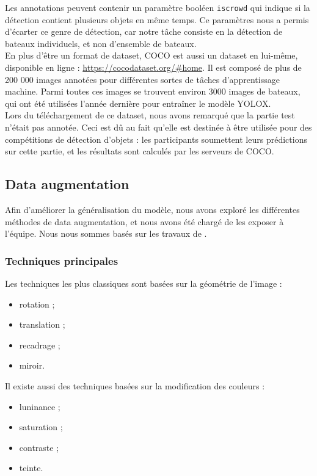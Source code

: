 Les annotations peuvent contenir un paramètre booléen \texttt{iscrowd} qui indique si
la détection contient plusieurs objets en même temps. Ce paramètres nous a permis d'écarter
ce genre de détection, car notre tâche consiste en la détection de bateaux individuels,
et non d'ensemble de bateaux. \\

En plus d'être un format de dataset, COCO est aussi un dataset en lui-même, disponible
en ligne : \url{https://cocodataset.org/#home}.
Il est composé de plus de 200 000 images annotées pour différentes sortes de tâches d'apprentissage machine.
Parmi toutes ces images se trouvent environ 3000 images de bateaux, qui ont été utilisées
l'année dernière pour entraîner le modèle YOLOX. \\

Lors du téléchargement de ce dataset, nous avons remarqué que la partie test n'était pas annotée.
Ceci est dû au fait qu'elle est destinée à être utilisée pour des compétitions de détection d'objets :
les participants soumettent leurs prédictions sur cette partie, et les résultats sont calculés par les
serveurs de COCO.\\

\subsection{Data augmentation}

Afin d'améliorer la généralisation du modèle, nous avons exploré les différentes méthodes de data augmentation,
et nous avons été chargé de les exposer à l'équipe. Nous nous sommes basés
sur les travaux de \cite{Mumuni_Mumuni_2022}.

\subsubsection{Techniques principales}

Les techniques les plus classiques sont basées sur la géométrie de l'image :
\begin{itemize}
    \item rotation ;
    \item translation ;
    \item recadrage ;
    \item miroir.
\end{itemize}

Il existe aussi des techniques basées sur la modification des couleurs :
\begin{itemize}
    \item luninance ;
    \item saturation ;
    \item contraste ;
    \item teinte.
\end{itemize}

